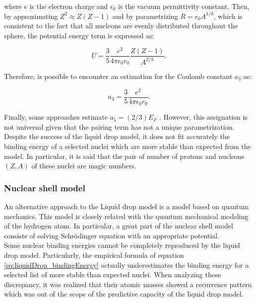 \documentclass[openany]{book}
\begin{document}
where $e$ is the electron charge and  $\epsilon_0 $ is the vacuum permittivity constant. Then, by approximating $Z^2 \approx Z(Z-1)$ and by parametrizing $R = r_0A^{1/3}$, which is consistent to the fact that all nucleons are evenly distributed throughout the sphere, the potential energy term is expressed as: 

 \begin{equation}\label{eq:liquidDrop_FermiGas_coulombEnergy_approximate}
 	U = \frac{3}{5} \frac{e^2}{4\pi\epsilon_0 r_0} \frac{Z(Z-1)}{A^{2/3}}.
 \end{equation}

Therefore, is possible to encounter an estimation for the Coulomb constant $a_3$ as:

 \begin{equation}\label{eq:liquidDrop_FermiGas_coulombConstant}
	a_3 = \frac{3}{5} \frac{e^2}{4 \pi \epsilon_0 r_0}.
\end{equation}

Finally, some approaches estimate $a_5 = (2/3)E_F$ \cite{bohr_mottelson_1998}. However, this assignation is not universal given that the pairing term has not a unique parametrization. \\

Despite the success of the liquid drop model, it does not fit accurately the binding energy of a selected nuclei which are more stable than expected from the model. In particular, it is said that the pair of number of protons and nucleons $(Z, A)$ of these nuclei are magic numbers. 

\subsubsection{Nuclear shell model}  \label{ssub:nuclearShellModel}

An alternative approach to the Liquid drop model is a model based on quantum mechanics. This model is closely related with the quantum mechanical modeling of the hydrogen atom. In particular, a great part of the nuclear shell model consists of solving Schrödinger equation with an appropriate potential. \\

Some nuclear binding energies cannot be completely reproduced by the liquid drop model. Particularly, the empirical formula of equation \ref{eq:liquidDrop_bindingEnergy} actually underestimates the binding energy for a selected list of more stable than expected nuclei. When analyzing those discrepancy, it was realized that their atomic masses showed a recurrence pattern which was out of the scope of the predictive capacity of the liquid drop model.  \\
\end{document}
